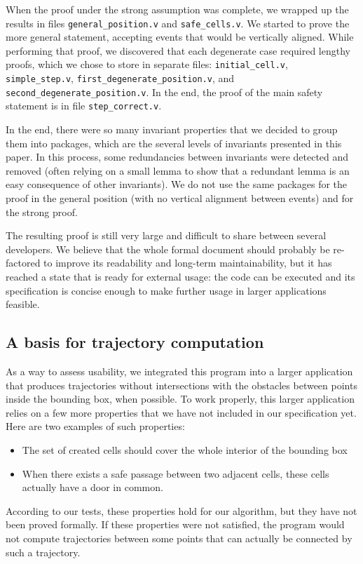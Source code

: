 \documentclass[a4paper, USenglish, cleveref, autoref, thm-restate, final]{lipics-v2021}
\begin{document}
When the proof under the strong assumption was complete, we wrapped up the
results in files {\tt general\_position.v} and {\tt safe\_cells.v}.
We started to prove the more general statement, accepting events that
would be vertically
aligned.  While performing that proof, we discovered that each degenerate
case required lengthy proofs, which we chose to store in separate files:
{\tt initial\_cell.v}, {\tt simple\_step.v},
{\tt first\_degenerate\_position.v}, and
{\tt second\_degenerate\_position.v}.  In the end, the proof of the main
safety statement is in file {\tt step\_correct.v}.

In the end, there were so many invariant properties that we decided to group
them into packages, which are the several levels of invariants presented
in this paper.  In this process, some redundancies between invariants were
detected and removed (often relying on a small lemma to show that a redundant
lemma is an easy consequence of other invariants).  We do not use the same
packages for the proof in the general position (with no vertical alignment
between events) and for the strong proof.

The resulting proof is still very large and difficult to share between several
developers.  We believe that the whole formal document should probably be
re-factored to improve its readability and long-term maintainability, but it
has reached a state that is ready for external usage: the code can be executed
and its specification is concise enough to make further usage in larger
applications feasible.

\subsection{A basis for trajectory computation}
As a way to assess usability, we integrated this program into a larger
application that produces trajectories without intersections with
the obstacles between points inside the bounding
box, when possible.  To work properly, this larger application relies
on a few more properties that we have not included in our specification yet.
Here are two examples of such properties:
\begin{itemize}
\item The set of created cells should cover the whole interior of the
  bounding box
\item When there exists a safe passage between two adjacent cells, these
  cells actually have a door in common.
\end{itemize}
According to our tests, these properties hold for our algorithm, but
they have not been proved formally.  If these properties were not satisfied,
the program would not compute trajectories between some points that can
actually be connected by such a trajectory.
\end{document}
